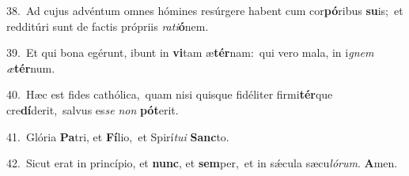 {\numbfont\textcolor{\numbcolor}{38.}}~Ad cujus advéntum omnes hómines resúrgere habent cum cor\-\textbf{pó}\-ribus \textbf{su}\-is;~\star et redditúri sunt de factis própriis \textit{ra}\-\textit{ti}\textbf{ó}nem.\par
{\numbfont\textcolor{\numbcolor}{39.}}~Et qui bona egérunt, ibunt in \textbf{vi}\-tam æ\-\textbf{tér}\-nam:~\star qui vero mala, in i\textit{gnem} \textit{æ}\-\textbf{tér}num.\par
{\numbfont\textcolor{\numbcolor}{40.}}~Hæc est fides cathólica,~\dagger quam nisi quisque fidéliter firmi\-\textbf{tér}\-que cre\-\textbf{dí}\-derit,~\star salvus es\textit{se} \textit{non} \textbf{pót}\-erit.\par
{\numbfont\textcolor{\numbcolor}{41.}}~Glória \textbf{Pa}\-tri, et \textbf{Fí}\-lio,~\star et Spirí\-\textit{tu}\-\textit{i} \textbf{Sanc}\-to.\par
{\numbfont\textcolor{\numbcolor}{42.}}~Sicut erat in princípio, et \textbf{nunc}\-, et \textbf{sem}\-per,~\star et in sǽcula sæcu\-\textit{ló}\-\textit{rum}. \textbf{A}\-men.\par
